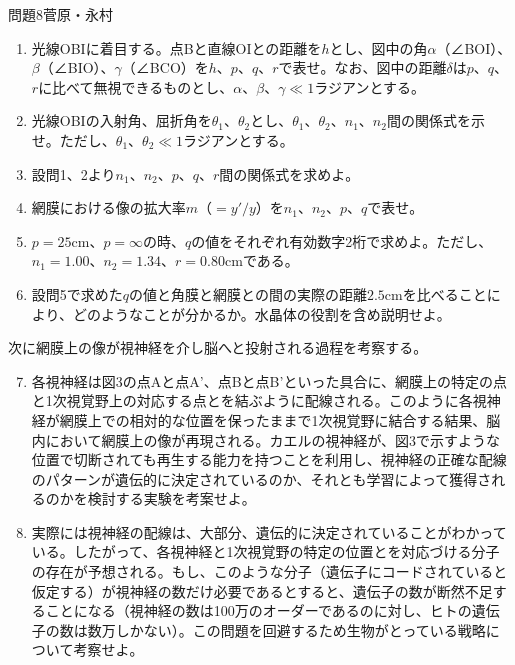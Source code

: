 \documentclass[fleqn]{jbook}
\begin{document}
\begin{question}{問題8}{菅原・永村}
\begin{enumerate}
\item 光線OBIに着目する。点Bと直線OIとの距離を$h$とし、図中の角$\alpha$（∠BOI）、$\beta$（∠BIO）、$\gamma$（∠BCO）を$h$、$p$、$q$、$r$で表せ。なお、図中の距離$\delta$は$p$、$q$、$r$に比べて無視できるものとし、$\alpha$、$\beta$、$\gamma \ll 1$ラジアンとする。
\item 光線OBIの入射角、屈折角を$\theta_1$、$\theta_2$とし、$\theta_1$、$\theta_2$、$n_1$、$n_2$間の関係式を示せ。ただし、$\theta_1$、$\theta_2 \ll 1$ラジアンとする。
\item 設問1、2より$n_1$、$n_2$、$p$、$q$、$r$間の関係式を求めよ。
\item 網膜における像の拡大率$m$（$= y'/y$）を$n_1$、$n_2$、$p$、$q$で表せ。
\item $p=25$cm、$p= \infty$の時、$q$の値をそれぞれ有効数字2桁で求めよ。ただし、$n_1 = 1.00$、$n_2 = 1.34$、$r = 0.80$cmである。
\item 設問5で求めた$q$の値と角膜と網膜との間の実際の距離$2.5$cmを比べることにより、どのようなことが分かるか。水晶体の役割を含め説明せよ。
\end{enumerate}

次に網膜上の像が視神経を介し脳へと投射される過程を考察する。
\begin{enumerate}\setcounter{enumi}{6}
\item 各視神経は図3の点Aと点A'、点Bと点B'といった具合に、網膜上の特定の点と1次視覚野上の対応する点とを結ぶように配線される。このように各視神経が網膜上での相対的な位置を保ったままで1次視覚野に結合する結果、脳内において網膜上の像が再現される。カエルの視神経が、図3で示すような位置で切断されても再生する能力を持つことを利用し、視神経の正確な配線のパターンが遺伝的に決定されているのか、それとも学習によって獲得されるのかを検討する実験を考案せよ。
\item 実際には視神経の配線は、大部分、遺伝的に決定されていることがわかっている。したがって、各視神経と1次視覚野の特定の位置とを対応づける分子の存在が予想される。もし、このような分子（遺伝子にコードされていると仮定する）が視神経の数だけ必要であるとすると、遺伝子の数が断然不足することになる（視神経の数は100万のオーダーであるのに対し、ヒトの遺伝子の数は数万しかない）。この問題を回避するため生物がとっている戦略について考察せよ。


\end{enumerate}
\end{question}
\end{document}
